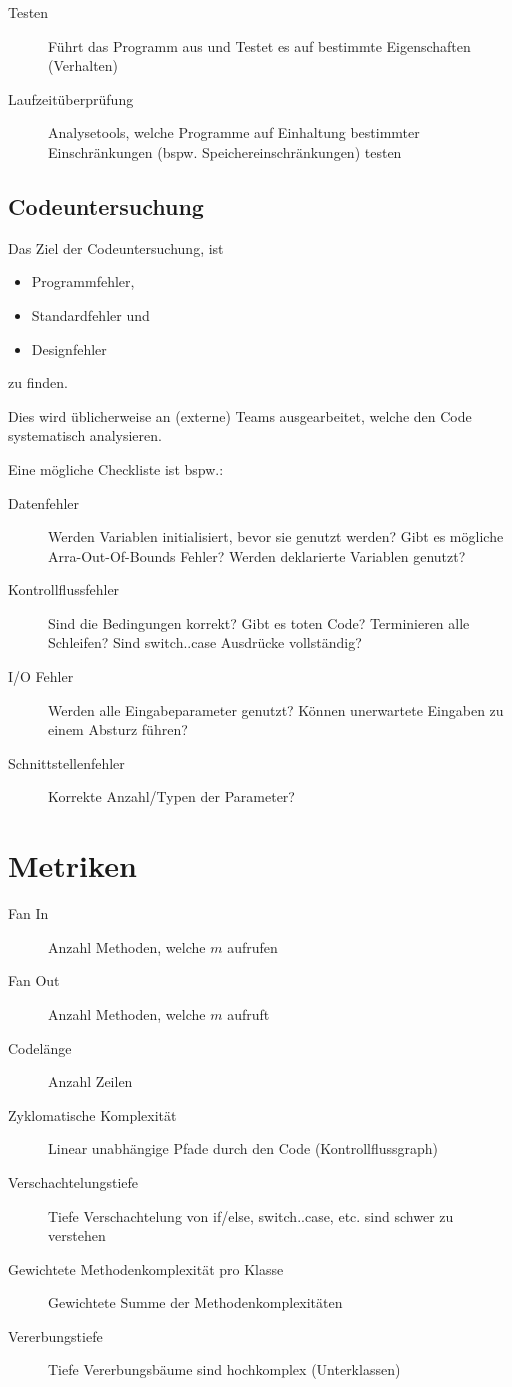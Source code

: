 				\begin{description}
					\item[Testen] Führt das Programm aus und Testet es auf bestimmte Eigenschaften (Verhalten)
					\item[Laufzeitüberprüfung] Analysetools, welche Programme auf Einhaltung bestimmter Einschränkungen (bspw. Speichereinschränkungen) testen
				\end{description}

		\subsection{Codeuntersuchung}
			Das Ziel der Codeuntersuchung, ist
			\begin{itemize}
				\item Programmfehler,
				\item Standardfehler und
				\item Designfehler
			\end{itemize}
			zu finden.
			
			Dies wird üblicherweise an (externe) Teams ausgearbeitet, welche den Code systematisch analysieren.
			
			Eine mögliche Checkliste ist bspw.:
			\begin{description}
				\item[Datenfehler] Werden Variablen initialisiert, bevor sie genutzt werden? Gibt es mögliche Arra-Out-Of-Bounds Fehler? Werden deklarierte Variablen genutzt?
				\item[Kontrollflussfehler] Sind die Bedingungen korrekt? Gibt es toten Code? Terminieren alle Schleifen? Sind switch..case Ausdrücke vollständig?
				\item[I/O Fehler] Werden alle Eingabeparameter genutzt? Können unerwartete Eingaben zu einem Absturz führen?
				\item[Schnittstellenfehler] Korrekte Anzahl/Typen der Parameter?
			\end{description}
	
	\section{Metriken}
		\label{sec:metrics}
		
		\begin{description}
			\item[Fan In] Anzahl Methoden, welche $ m $ aufrufen
			\item[Fan Out] Anzahl Methoden, welche $ m $ aufruft
			\item[Codelänge] Anzahl Zeilen
			\item[Zyklomatische Komplexität] Linear unabhängige Pfade durch den Code (Kontrollflussgraph)
			\item[Verschachtelungstiefe] Tiefe Verschachtelung von if/else, switch..case, etc. sind schwer zu verstehen
			\item[Gewichtete Methodenkomplexität pro Klasse] Gewichtete Summe der Methodenkomplexitäten
			\item[Vererbungstiefe] Tiefe Vererbungsbäume sind hochkomplex (Unterklassen)
		\end{description}
	

